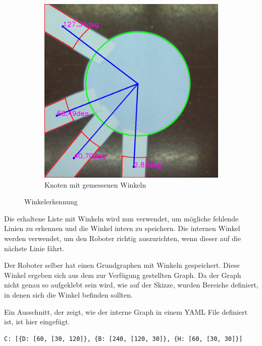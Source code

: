 \begin{figure}[H]
\begin{subfigure}{0.45\textwidth}
\includegraphics[width=0.95\linewidth]{assets/informatik-prototyp/opencv/angle_detection/node_with_edge_angles_annotated.png} 
\caption{Knoten mit gemessenen Winkeln}
\label{fig:node-angles}
\end{subfigure}

\caption{Winkelerkennung}
\label{fig:angle-recognition}
\end{figure}

Die erhaltene Liste mit Winkeln wird nun verwendet, um mögliche fehlende Linien zu erkennen und die Winkel intern zu speichern. Die internen Winkel werden verwendet, um den Roboter richtig auszurichten, wenn dieser auf die nächste Linie fährt.

Der Roboter selber hat einen Grundgraphen mit Winkeln gespeichert. Diese Winkel ergeben sich aus dem zur Verfügung gestellten Graph.
Da der Graph nicht genau so aufgeklebt sein wird, wie auf der Skizze, wurden Bereiche definiert, in denen sich die Winkel befinden sollten.

Ein Ausschnitt, der zeigt, wie der interne Graph in einem YAML File definiert ist, ist hier eingefügt.

\begin{verbatim}
C: [{D: [60, [30, 120]}, {B: [240, [120, 30]}, {H: [60, [30, 30]}]
\end{verbatim}

